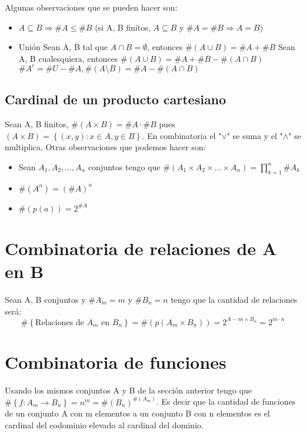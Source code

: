 \documentclass{report}
\newcommand{\card}[1]{\##1}
\begin{document}
Algunas observaciones que se pueden hacer son: \begin{itemize}
    \item $A \subseteq B \Rightarrow \card{A} \leq \card{B}$ (si A, B finitos, $A \subseteq B$ y $\card{A}=\card{B} \Rightarrow A = B$) 
    \item Unión
        \subitem Sean A, B tal que $A \cap B = \emptyset$, entonces $\card{(A \cup B)} = \card{A} + \card{B}$ 
        \subitem Sean A, B cualesquiera, entonces $\card{(A \cup B)} = \card{A} + \card{B} - \card{(A \cap B)}$
        \subitem $\card{A^c} = \card{U} - \card{A}, \card{(A \setminus B)} = \card{A} - \card{(A \cap B)}$      
\end{itemize}

\subsection{Cardinal de un producto cartesiano}
Sean A, B finitos, $\card{(A \times B)} = \card{A} \cdot \card{B}$ pues $(A \times B) = \left\{(x,y): x \in A, y \in B\right\}$. En combinatoria el "$\lor$" se suma y el "$\land$" se multiplica. Otras observaciones que podemos hacer son: \begin{itemize}
    \item Sean $A_1, A_2,...,A_n$ conjuntos tengo que $\card{(A_1 \times A_2 \times ... \times A_n)} = \prod_{k=1}^n \card{A_k}$
    \item $\card{(A^n)} = (\card{A})^n$
    \item $\card{(p(a))} = 2^{\card{A}}$
\end{itemize}

\section{Combinatoria de relaciones de A en B}
Sean A, B conjuntos y $\card{A_m} = m$ y $\card{B_n} = n$ tengo que la cantidad de relaciones será:
\begin{equation}
    \card{\left\{\text{Relaciones de $A_m$ en $B_n$}\right\}} = \card{(p(A_m \times B_n))} = 2^{A-m \times B_n} = 2 ^{m \cdot n}
\end{equation}

\section{Combinatoria de funciones}
Usando los mismos conjuntos A y B de la sección anterior tengo que $\card{\left\{f: A_m \rightarrow B_n\right\}} = n^m = \card{(B_n)}^{\card{(A_m)}}$. Es decir que la cantidad de funciones de un conjunto A con m elementos a un conjunto B con n elementos es el cardinal del codominio elevado al cardinal del dominio.
\end{document}
